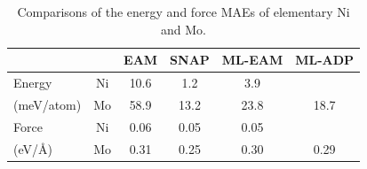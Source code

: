 \documentclass[final,3p,times]{elsarticle}
\begin{document}
% 
%
\begin{table}
\centering
\begin{tabular}{lccccc}
\hline
            &    & EAM\cite{ZJW2} & SNAP\cite{SNAP} & ML-EAM & ML-ADP \\
\hline
Energy     & Ni & 10.6           & 1.2             & 3.9    &        \\
(meV/atom) & Mo & 58.9           & 13.2            & 23.8   & 18.7   \\
\hline
Force      & Ni & 0.06           & 0.05            & 0.05   &        \\
(eV/\AA)   & Mo & 0.31           & 0.25            & 0.30   & 0.29   \\
\hline
\end{tabular}
\caption{\label{table:Mo_Ni_mae} Comparisons of the energy and force MAEs of 
elementary Ni and Mo. 
}
\end{table}
\end{document}
